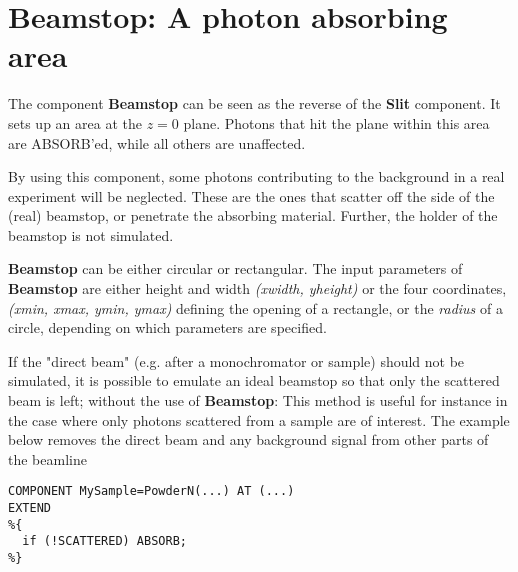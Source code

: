 \section{Beamstop: A photon absorbing area}
\label{beamstop}


The component \textbf{Beamstop} can be seen as the reverse of
the \textbf{Slit} component.
It sets up an area at the $z=0$ plane. Photons that hit the plane 
within this area are ABSORB'ed, while all others are unaffected.

By using this component, some photons contributing to the background
in a real experiment will be neglected.
These are the ones that scatter off the side
of the (real) beamstop, or penetrate the absorbing material.
Further, the holder of the beamstop is not simulated.

\textbf{Beamstop} can be either circular or rectangular.
The input parameters of \textbf{Beamstop} are either height and width \textit{(xwidth, yheight)} or the four coordinates,\textit{(xmin, xmax, ymin, ymax)}
defining the opening of a rectangle, or the \textit{radius} of
a circle, depending on which parameters are specified.

If the "direct beam" (e.g. after a monochromator or sample) should not be
simulated, it is possible to emulate an ideal beamstop 
so that only the scattered beam is left;
without the use of \textbf{Beamstop}:
This method is useful for instance in the case where only photons 
scattered from a sample are of interest. 
The example below removes the direct beam and 
any background signal from other parts of the beamline
\begin{verbatim}
COMPONENT MySample=PowderN(...) AT (...)
EXTEND
%{
  if (!SCATTERED) ABSORB;
%}
\end{verbatim}
